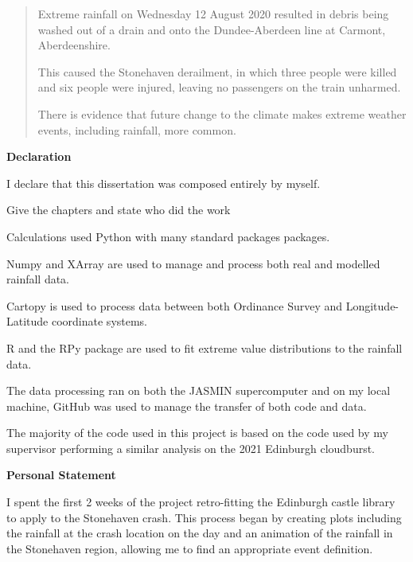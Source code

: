 \documentclass[12pt,a4paper]{report}
\begin{document}
\newpage



\begin{abstract}
Extreme rainfall on Wednesday 12 August 2020 resulted in debris being washed out of a drain and onto the Dundee-Aberdeen line at Carmont, Aberdeenshire.

This caused the Stonehaven derailment,
    in which three people were killed and six people were injured,
    leaving no passengers on the train unharmed.

There is evidence that future change to the climate makes extreme weather events, including rainfall,
    more common.

\end{abstract}


\begin{center}
\textbf{Declaration}
\end{center}

I declare that this dissertation was composed entirely by myself.

Give the chapters and state who did the work

\bigskip

Calculations used Python with many standard packages packages.

Numpy and XArray are used to manage and process both real and modelled rainfall data.

Cartopy is used to process data between both Ordinance Survey and Longitude-Latitude coordinate systems.

R and the RPy package are used to fit extreme value distributions to the rainfall data.

The data processing ran on both the JASMIN supercomputer and on my local machine,
GitHub was used to manage the transfer of both code and data.

The majority of the code used in this project is based on the code used by my supervisor performing a similar analysis on the 2021 Edinburgh cloudburst.


\newpage

\begin{center}
\textbf{Personal Statement} %
\end{center}

I spent the first 2 weeks of the project retro-fitting the Edinburgh castle
library to apply to the Stonehaven crash.
This process began by creating plots including the
rainfall at the crash location on the day and an animation of the rainfall
in the Stonehaven region, allowing me to find an appropriate event definition.
\end{document}
